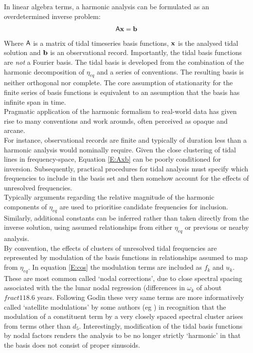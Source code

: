 In linear algebra terms,  a harmonic analysis can be formulated as an overdetermined inverse problem:
\begin{equation}
\label{E:Axb}
\mathsf{A} \mathbf{x}=\mathbf{b} 
\end{equation}
Where $\mathsf{A}$ is a matrix of tidal timeseries basis functions, $\mathbf{x}$ is the analysed tidal solution and $\mathbf{b}$ is an observational record. Importantly, the tidal basis functions are \emph{not} a Fourier basis.   The tidal basis is developed from the combination of the harmonic decomposition of $\eta_{eq}$ and a series of conventions.  The resulting basis is neither orthogonal nor complete.  The core assumption of stationarity for the finite series of basis functions is equivalent to an assumption that the basis has infinite span in time. \\




Pragmatic application of the harmonic formalism to real-world data has given rise to many conventions and work arounds, often perceived as opaque and arcane. \\

For instance, observational records are finite and typically of duration less than a harmonic analysis would nominally require.  Given the close clustering of tidal lines in frequency-space, Equation \ref{E:Axb} can be poorly conditioned for inversion.  Subsequently, practical procedures for tidal analysis must specify which frequencies to include in the basis set and then somehow account for the effects of unresolved frequencies\cite{Foreman:2009bg}.   \\
Typically arguments regarding the relative magnitude of the harmonic components of $\eta_{eq}$ are used to prioritise candidate frequencies for inclusion. Similarly, additional constants can be inferred rather than taken directly from the inverse solution, using assumed relationships from either $\eta_{eq}$ or previous or nearby analysis. \\
By convention, the effects of clusters of unresolved tidal frequencies are represented by modulation of the basis functions in relationships assumed to map from $\eta_{eq}$.  In equation \ref{E:cos} the modulation terms are included as $f_k$ and $u_k$. These are most common called `nodal corrections', due to close spectral spacing associated with the the lunar nodal regression (differences in $\omega_k$ of about $fract{1}{18.6}$ years.  Following Godin these very same terms are more informatively called `satellite modulations' by some authors (eg \citep{Foreman:2009bg}) in recognition that the modulation of a constituent term by a very closely spaced spectral cluster arises from terms other than $d_5$. Interestingly, modification of the tidal basis functions by nodal factors renders the analysis to be no longer strictly `harmonic' in that the basis does not consist of proper sinusoids.\\






